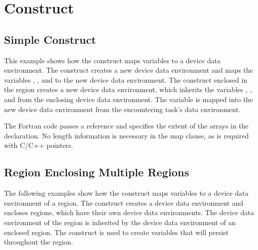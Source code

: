 \section{ Construct}
\label{sec:target_data}

\subsection{Simple  Construct}
\label{subsec:target_data_simple}

This example shows how the  construct maps variables 
to a device data environment. The  construct creates 
a new device data environment and maps the variables , , and  to the new device 
data environment. The  construct enclosed in the 
 region creates a new device data environment, which inherits the 
variables , , and  from the enclosing device data environment. The variable 
 is mapped into the new device data environment from the encountering task's data 
environment.


\pagebreak
The Fortran code passes a reference and specifies the extent of the arrays in the 
declaration. No length information is necessary in the map clause, as is required 
with C/C++ pointers.


\subsection{ Region Enclosing Multiple  Regions}
\label{subsec:target_data_multiregion}

The following examples show how the  construct maps 
variables to a device data environment of a  region. 
The  construct creates a device data environment and encloses  
regions, which have their own device data environments. The device data environment 
of the  region is inherited by the device data environment 
of an enclosed  region. The  construct 
is used to create variables that will persist throughout the  
region.

